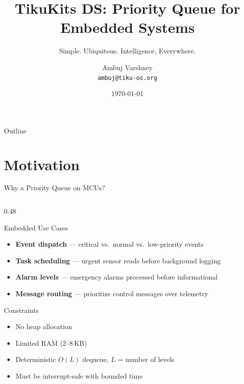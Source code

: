 \documentclass[aspectratio=169, 10pt]{beamer}
\title[TikuKits DS]{TikuKits DS: Priority Queue for Embedded Systems}
\subtitle{Simple. Ubiquitous. Intelligence, Everywhere.}
\author[Ambuj Varshney]{Ambuj Varshney \\ \texttt{ambuj@tiku-os.org}}
\date{\today}
\begin{document}
\begin{frame}
\titlepage
\end{frame}

\begin{frame}{Outline}
\tableofcontents
\end{frame}

\section{Motivation}

\begin{frame}{Why a Priority Queue on MCUs?}
\begin{columns}[T]
\begin{column}{0.48\textwidth}
\begin{block}{Embedded Use Cases}
\begin{itemize}
  \item \textbf{Event dispatch} --- critical vs.\ normal vs.\ low-priority events
  \item \textbf{Task scheduling} --- urgent sensor reads before background logging
  \item \textbf{Alarm levels} --- emergency alarms processed before informational
  \item \textbf{Message routing} --- prioritize control messages over telemetry
\end{itemize}
\end{block}

\begin{block}{Constraints}
\begin{itemize}
  \item No heap allocation
  \item Limited RAM (2--8\,KB)
  \item Deterministic $O(L)$ dequeue, $L$ = number of levels
  \item Must be interrupt-safe with bounded time
\end{itemize}
\end{block}
\end{column}


\end{columns}
\end{frame}
\end{document}
